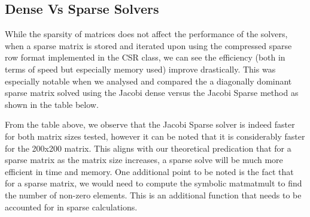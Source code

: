 \documentclass[twoside,twocolumn]{article}
\begin{document}
\subsection{Dense Vs Sparse Solvers}
While the sparsity of matrices does not affect the performance of the solvers, when a sparse matrix is stored and iterated upon using the compressed sparse row format implemented in the CSR class, we can see the efficiency (both in terms of speed but especially memory used) improve drastically. This was especially notable when we analysed and compared the a diagonally dominant sparse matrix solved using the Jacobi dense versus the Jacobi Sparse method as shown in the table below.
\begin{table}[H]
\caption{Solving a Sparse Diagonally Dominant Matrix with a Dense Vs Sparse Jacobi Solver}
\label{tab:my-table}
\end{table}
From the table above, we observe that the Jacobi Sparse solver is indeed faster for both matrix sizes tested, however it can be noted that it is considerably faster for the 200x200 matrix. This aligns with our theoretical predication that for a sparse matrix as the matrix size increases, a sparse solve will be much more efficient in time and memory. One additional point to be noted is the fact that for a sparse matrix, we would need to compute the symbolic matmatmult to find the number of non-zero elements. This is an additional function that needs to be accounted for in sparse calculations. 
\end{document}

